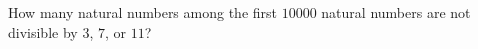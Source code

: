 How many natural numbers among the first $10000$ natural numbers are not divisible by $3$, $7$, or $11$?
